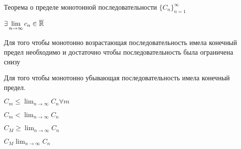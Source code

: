 \begin{theorem} Теорема о пределе монотонной последовательности
$\{C_n\}_{n=1}^\infty$

$\exists \lim_{n \to \infty} c_n \in \overline \R$

Для того чтобы монотонно возрастающая последовательность имела конечный предел необходимо и достаточно чтобы последовательность была ограничена снизу

Для того чтобы монотонно убывающая последовательность имела конечный предел.

$C_m \leq \lim_{n \to \infty} C_n \forall m$

$C_m < \lim_{n \to \infty} C_n$

$C_M \geq \lim_{n \to \infty} C_n$

$C_M  \lim_{n \to \infty} C_n$

\end{theorem}

